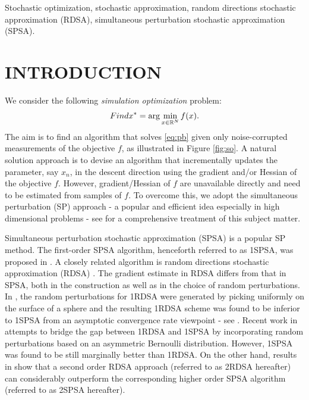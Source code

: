 \documentclass[twocolumn]{IEEEtran}
\begin{document}
\begin{IEEEkeywords}
Stochastic optimization, stochastic approximation, random directions stochastic approximation (RDSA), simultaneous perturbation stochastic approximation (SPSA).
\end{IEEEkeywords}

\section{INTRODUCTION}
\label{sec:introduction}
We consider the following \textit{simulation optimization} problem:
\begin{align}
\mbox{Find } x^* = \arg\min_{x \in \R^N} f(x). \label{eq:pb}
\end{align}
The aim is to find an algorithm that solves \eqref{eq:pb} given only noise-corrupted measurements of the objective $f$, as illustrated in Figure \ref{fig:so}.
A natural solution approach is to devise an algorithm that incrementally updates the parameter, say $x_n$, in the descent direction using the gradient and/or Hessian of the objective $f$. However, gradient/Hessian of $f$ are unavailable directly and need to be estimated from samples of $f$. 
To overcome this, we adopt the simultaneous perturbation (SP) approach - a popular and efficient idea especially in high dimensional problems - see \cite{bhatnagar-book} for a comprehensive treatment of this subject matter. 


Simultaneous perturbation stochastic approximation (SPSA) is a popular SP method. The first-order SPSA algorithm, henceforth referred to as 1SPSA, was proposed in \cite{spall}.  A closely related algorithm is random directions stochastic approximation (RDSA) \cite[pp.~58-60]{kushcla}. The gradient estimate in RDSA differs from that in SPSA, both in the construction as well as in the choice of random perturbations.  In \cite{kushcla}, the random perturbations for 1RDSA were generated by picking uniformly on the surface of a sphere and the resulting 1RDSA scheme was found to be  inferior to 1SPSA from an asymptotic convergence rate viewpoint - see \cite{chin1997comparative}.  Recent work in \cite{prashanth2015rdsa} attempts to bridge the gap between 1RDSA and 1SPSA by incorporating random perturbations based on an asymmetric Bernoulli distribution. However,  1SPSA was found to be still marginally better than 1RDSA. 
On the other hand, results in \cite{prashanth2015rdsa} show that a second order RDSA approach (referred to as 2RDSA hereafter) can considerably outperform the corresponding higher order SPSA algorithm \cite{spall_adaptive} (referred to as 2SPSA hereafter).  
\end{document}
